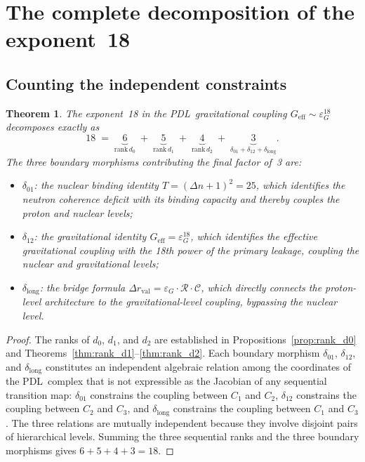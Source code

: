 \documentclass[11pt,a4paper]{article}
\newtheorem{theorem}{Theorem}[section]
\theoremstyle{definition}
\newcommand{\PDL}{\textnormal{PDL}}
\newcommand{\rval}{r_{\mathrm{val}}}
\newcommand{\epsg}{\varepsilon_G}
\newcommand{\rank}{\mathrm{rank}}
\newcommand{\dmap}[1]{d_{#1}}
\newcommand{\dlong}{\delta_{\mathrm{long}}}
\newcommand{\calR}{\mathcal{R}}
\newcommand{\calC}{\mathcal{C}}
\begin{document}
\section{The complete decomposition of the exponent~18}
\label{sec:decomp}

\subsection{Counting the independent constraints}
\label{subsec:counting}

\begin{theorem}
  \label{thm:18_decomp}
  The exponent~18 in the \PDL\ gravitational coupling $G_{\mathrm{eff}} \sim \epsg^{18}$ decomposes exactly as
  \begin{equation}
    \label{eq:18_decomp}
    18 \;=\;
    \underbrace{6}_{\rank\,\dmap{0}}
    \;+\;
    \underbrace{5}_{\rank\,\dmap{1}}
    \;+\;
    \underbrace{4}_{\rank\,\dmap{2}}
    \;+\;
    \underbrace{3}_{\delta_{01} + \delta_{12} + \dlong}.
  \end{equation}
  The three boundary morphisms contributing the final factor of~3 are:
  \begin{itemize}
    \item $\delta_{01}$: the nuclear binding identity $T = (\Delta n + 1)^2 = 25$, which identifies the neutron coherence deficit with its binding capacity and thereby couples the proton and nuclear levels;\cite{Nuclear_Stability_PDL_2026}
    \item $\delta_{12}$: the gravitational identity $G_{\mathrm{eff}} = \epsg^{18}$, which identifies the effective gravitational coupling with the 18th power of the primary leakage, coupling the nuclear and gravitational levels;\cite{Exponent_18_PDL_2026}
    \item $\dlong$: the bridge formula $\Delta\rval = \epsg \cdot \calR \cdot \calC$, which directly connects the proton-level architecture to the gravitational-level coupling, bypassing the nuclear level.\cite{Bridge_Formula_PDL_2026}
  \end{itemize}
\end{theorem}

\begin{proof}
The ranks of $\dmap{0}$, $\dmap{1}$, and $\dmap{2}$ are established in Propositions~\ref{prop:rank_d0} and Theorems~\ref{thm:rank_d1}--\ref{thm:rank_d2}. Each boundary morphism $\delta_{01}$, $\delta_{12}$, and $\dlong$ constitutes an independent algebraic relation among the coordinates of the \PDL\ complex that is not expressible as the Jacobian of any sequential transition map: $\delta_{01}$ constrains the coupling between $C_1$ and $C_2$, $\delta_{12}$ constrains the coupling between $C_2$ and $C_3$, and $\dlong$ constrains the coupling between $C_1$ and $C_3$. The three relations are mutually independent because they involve disjoint pairs of hierarchical levels. Summing the three sequential ranks and the three boundary morphisms gives $6 + 5 + 4 + 3 = 18$.
\end{proof}
\end{document}
